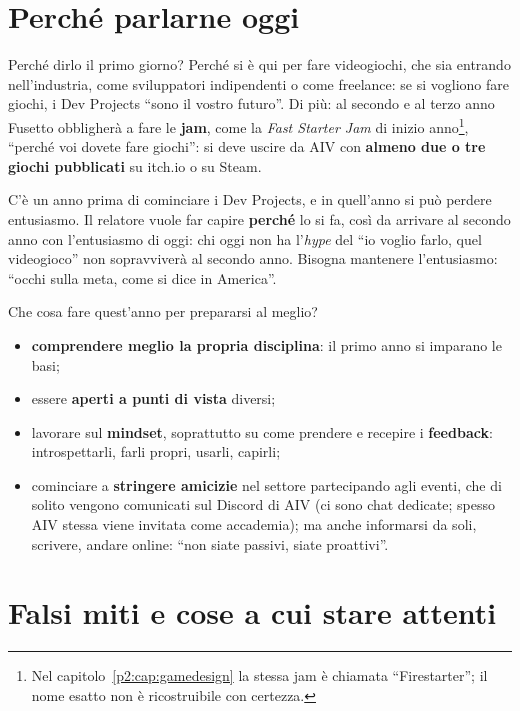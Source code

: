 \section{Perché parlarne oggi}
\label{p1:sec:perche}

Perché dirlo il primo giorno? Perché si è qui per fare videogiochi, che sia
entrando nell'industria, come sviluppatori indipendenti o come freelance:
se si vogliono fare giochi, i Dev Projects ``sono il vostro futuro''. Di
più: al secondo e al terzo anno Fusetto obbligherà a fare le \textbf{jam},
come la \emph{Fast Starter Jam} di inizio anno\footnote{Nel
capitolo~\ref{p2:cap:gamedesign} la stessa jam è chiamata ``Firestarter''; il
nome esatto non è ricostruibile con certezza.}, ``perché voi dovete fare
giochi'': si deve uscire da AIV con \textbf{almeno due o tre giochi
pubblicati} su itch.io o su Steam.

C'è un anno prima di cominciare i Dev Projects, e in quell'anno si può
perdere entusiasmo. Il relatore vuole far capire \textbf{perché} lo si fa,
così da arrivare al secondo anno con l'entusiasmo di oggi: chi oggi non ha
l'\emph{hype} del ``io voglio farlo, quel videogioco'' non sopravviverà al
secondo anno. Bisogna mantenere l'entusiasmo: ``occhi sulla meta, come si
dice in America''.

Che cosa fare quest'anno per prepararsi al meglio?
\begin{itemize}
  \item \textbf{comprendere meglio la propria disciplina}: il primo anno si
        imparano le basi;
  \item essere \textbf{aperti a punti di vista} diversi;
  \item lavorare sul \textbf{mindset}, soprattutto su come prendere e
        recepire i \textbf{feedback}: introspettarli, farli propri, usarli,
        capirli;
  \item cominciare a \textbf{stringere amicizie} nel settore partecipando
        agli eventi, che di solito vengono comunicati sul Discord di AIV
        (ci sono chat dedicate; spesso AIV stessa viene invitata come
        accademia); ma anche informarsi da soli, scrivere, andare online:
        ``non siate passivi, siate proattivi''.
\end{itemize}

\section{Falsi miti e cose a cui stare attenti}
\label{p1:sec:miti}

